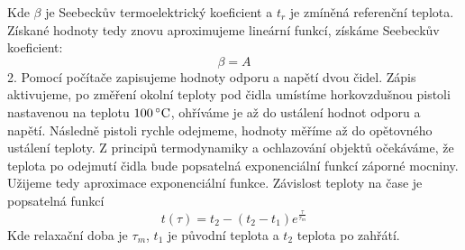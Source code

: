 \documentclass[czech,11pt,a4paper]{article}
\begin{document}
	Kde $\beta$ je Seebeckův termoelektrický koeficient a $t_r$ je zmíněná referenční teplota. 	Získané hodnoty tedy znovu aproximujeme lineární funkcí, získáme Seebeckův koeficient:
	\begin{equation}
		\beta = A
	\end{equation}
	2. Pomocí počítače zapisujeme hodnoty odporu a napětí dvou čidel. Zápis aktivujeme, po změření okolní teploty pod čidla umístíme horkovzdušnou pistoli nastavenou na teplotu $100\, ^\circ \rm C$, ohříváme je až do ustálení hodnot odporu a napětí. Následně pistoli rychle odejmeme, hodnoty měříme až do opětovného ustálení teploty. Z principů termodynamiky a ochlazování objektů očekáváme, že teplota po odejmutí čidla bude popsatelná exponenciální funkcí záporné mocniny. Užijeme tedy aproximace exponenciální funkce. Závislost teploty na čase je popsatelná funkcí
	\begin{equation}
		t (\tau) = t_2 - (t_2 - t_1)e^{\frac \tau {\tau _m}}
	\end{equation}
	Kde relaxační doba je $\tau _m$, $t_1$ je původní teplota a $t_2$ teplota po zahřátí.
\end{document}

